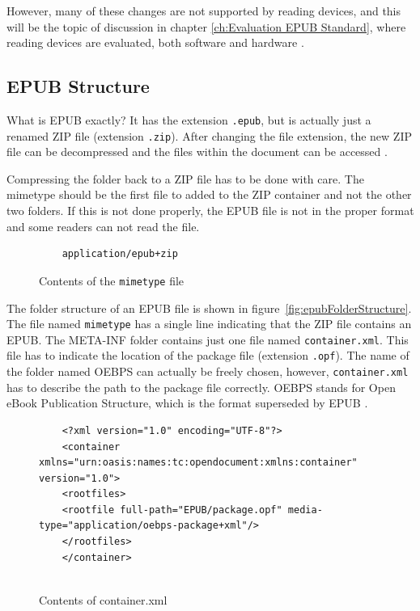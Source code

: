 However, many of these changes are not supported by reading devices, and this will be the topic of discussion in chapter \ref{ch:Evaluation EPUB Standard}, where reading devices are evaluated, both software and hardware \cite{EPUB30changes}.


\subsection{EPUB Structure}
What is EPUB exactly? It has the extension \lstinline{.epub}, but is actually just a renamed ZIP file (extension \lstinline{.zip}). After changing the file extension, the new ZIP file can be decompressed and the files within the document can be accessed \cite{EPUB3bp}.

Compressing the folder back to a ZIP file has to be done with care. The mimetype should be the first file to added to the ZIP container and not the other two folders. If this is not done properly, the EPUB file is not in the proper format and some readers can not read the file.


\begin{figure}
	\begin{lstlisting}
	application/epub+zip
	\end{lstlisting}
	\caption{Contents of the \lstinline{mimetype} file}
	\label{fig:mimetype}
\end{figure}

The folder structure of an EPUB file is shown in figure~\ref{fig:epubFolderStructure}. The file named \lstinline{mimetype} has a single line indicating that the ZIP file contains an EPUB. The META-INF folder contains just one file named \lstinline{container.xml}. This file has to indicate the location of the package file (extension \lstinline{.opf}). The name of the folder named OEBPS can actually be freely chosen, however, \lstinline{container.xml} has to describe the path to the package file correctly. OEBPS stands for Open eBook Publication Structure, which is the format superseded by EPUB \cite{OPSspecs}.

\begin{figure}
	\begin{lstlisting}
	<?xml version="1.0" encoding="UTF-8"?>
	<container xmlns="urn:oasis:names:tc:opendocument:xmlns:container" version="1.0">
	<rootfiles>
	<rootfile full-path="EPUB/package.opf" media-type="application/oebps-package+xml"/>
	</rootfiles>
	</container>
	
	\end{lstlisting}
	\caption{Contents of container.xml}
	\label{fig:containerXML}
\end{figure}

